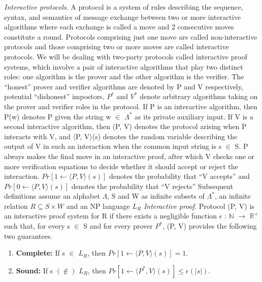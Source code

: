 \documentclass[a4paper]{article}
\newcommand{\quotes}[1]{``#1''}
\begin{document}
\textit{Interactive protocols}. A protocol is a system of rules describing the sequence, syntax, and semantics of message exchange between two or more interactive algorithms where each exchange is called a move and 2 consecutive moves constitute a round. Protocols comprising just one move are called non-interactive protocols and those comprising two or more moves are called interactive protocols. We will be dealing with two-party protocols called interactive proof systems, which involve a pair of interactive algorithms that play two distinct roles: one algorithm is the prover and the other algorithm is the verifier. The \quotes{honest} prover and verifier algorithms are denoted by P and V respectively, potential \quotes{dishonest} impostors, \textit{$P^{*}$} and \textit{$V^{*}$} denote arbitrary algorithms taking on the prover and verifier roles in the protocol. If P is an interactive algorithm, then P(w) denotes P given the string w $\in$ \(\Lambda^{*}\) as its private auxiliary input. If V is a second interactive algorithm, then (P, V) denotes the protocol arising when P interacts with V, and $\langle$P, V$\rangle$(s) denotes the random variable describing the output of V in such an interaction when the common input string is s $\in$ S. P always makes the final move in an interactive proof, after which V checks one or more verification equations to decide whether it should accept or reject the interaction. $Pr[1 \gets \langle P, V \rangle (s)]$ denotes the probability that \quotes{V accepts} and $Pr[0 \gets \langle P, V \rangle (s)]$ denotes the probability that \quotes{V rejects}
\newline
Subsequent definitions assume an alphabet \(\Lambda\), S and W as infinite subsets of \(\Lambda^{*}\), an infinite relation $R \subseteq S \times W$ and an NP language \textit{$L_R$} 
\newline
\newline
\textit{Interactive proof}. Protocol (P, V) is an interactive proof system for R if there exists a negligible function \(\epsilon\) : $\mathbb{N}$ \(\to\) $\mathbb{R}^{+}$ such that, for every s $\in$ S and for every prover \textit{$P^{*}$}, (P, V) provides the following two guarantees.
\begin{enumerate}
  \item \textbf{Complete:}  If s $\in$ \textit{$L_R$}, then $Pr[1 \gets \langle P, V \rangle (s)] = 1$.
  \item \textbf{Sound:}  If s $(\notin)$ \textit{$L_R$}, then $Pr[1 \gets \langle P^{*}, V \rangle (s)] \le \epsilon(|s|)$.
\end{enumerate}
\end{document}
